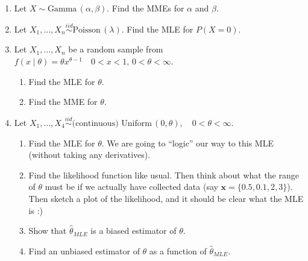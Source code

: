 \documentclass{article}
\newcommand{\vecn}[2]{#1_1, \ldots, #1_{#2}}	%
\newcommand{\follow}[1]{\sim \text{#1}\,}		%
\newcommand{\followsp}[2]{\overset{#1}\sim \text{#2}\,}		%
\begin{document}
\begin{enumerate}
    \item Let $X \follow{Gamma}(\alpha, \beta)$. Find the MMEs for $\alpha$ and $\beta$.\bigskip%
    
    \item Let $\vecn{X}{n} \followsp{iid}{Poisson}(\lambda)$. Find the MLE for $P(X = 0)$.\bigskip%
    
    \item Let $\vecn{X}{n}$ be a random sample from $f(x \mid \theta) = \theta x ^{\theta - 1} \quad 0 < x < 1, \, 0 < \theta < \infty$.
    \begin{enumerate}
        \item Find the MLE for $\theta$.%
        \item Find the MME for $\theta$. %
    \end{enumerate}\bigskip
    
    \item Let $\vecn{X}{4} \followsp{iid}{(continuous) Uniform}(0, \theta), \quad 0 < \theta < \infty$.%
    \begin{enumerate}
        \item Find the MLE for $\theta$. We are going to ``logic'' our way to this MLE (without taking any derivatives).
        \item[] Find the likelihood function like usual. Then think about what the range of $\theta$ must be if we actually have collected data (say $\mathbf{x} = \{0.5, 0.1, 2, 3\}$). Then sketch a plot of the likelihood, and it should be clear what the MLE is :)
        \item Show that $\hat{\theta}_{MLE}$ is a biased estimator of $\theta$.
        \item Find an unbiased estimator of $\theta$ as a function of $\hat{\theta}_{MLE}$. 
    \end{enumerate}
    
\end{enumerate}

\vspace{100pt}
\end{document}
